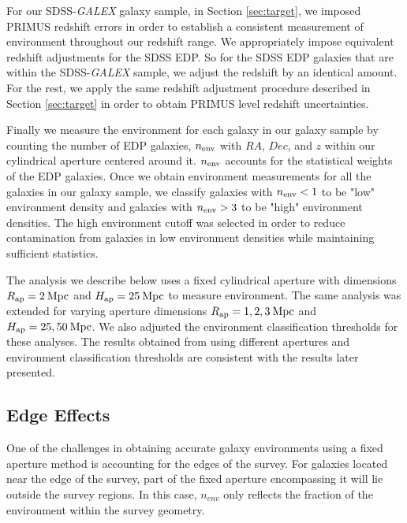 \documentclass{emulateapj}
\begin{document}
For our SDSS-{\em GALEX} galaxy sample, in Section \ref{sec:target}, we imposed PRIMUS redshift errors in order to establish a consistent measurement of environment throughout our redshift range. We appropriately impose equivalent redshift adjustments for the SDSS EDP. So for the SDSS EDP galaxies that are within the SDSS-{\em GALEX} sample, we adjust the redshift by an identical amount. For the rest, we apply the same redshift adjustment procedure described in Section \ref{sec:target} in order to obtain PRIMUS level redshift uncertainties. 

Finally we measure the environment for each galaxy in our galaxy sample by counting the number of EDP galaxies, $n_{\rm{env}}$ with $RA$, $Dec$, and $z$ within our cylindrical aperture centered around it. $n_{\rm{env}}$ accounts for the statistical weights of the EDP galaxies. Once we obtain environment measurements for all the galaxies in our galaxy sample, we classify galaxies with $n_{\rm{env}} < 1$ to be "low" environment density and galaxies with $n_{\rm{env}} > 3$ to be "high" environment densities. The high environment cutoff was selected in order to reduce contamination from galaxies in low environment densities while maintaining sufficient statistics. 

The analysis we describe below uses a fixed cylindrical aperture with dimensions $R_{\rm{ap}} = 2 \: \rm{Mpc}$ and $H_{\rm{ap}} = 25 \: \rm{Mpc}$ to measure environment. The same analysis was extended for varying aperture dimensions $R_{\rm{ap}} = 1, 2, 3 \: \rm{Mpc}$ and $H_{\rm{ap}} = 25, 50 \: \rm{Mpc}$. We also adjusted the environment classification thresholds for these analyses. The results obtained from using different apertures and environment classification thresholds are consistent with the results later presented.  

\subsection{Edge Effects} \label{sec:edgeeffect}
One of the challenges in obtaining accurate galaxy environments using a fixed aperture method is accounting for the edges of the survey. For galaxies located near the edge of the survey, part of the fixed aperture encompassing it will lie outside the survey regions. In this case, $n_{env}$ only reflects the fraction of the environment within the survey geometry.
\end{document}
